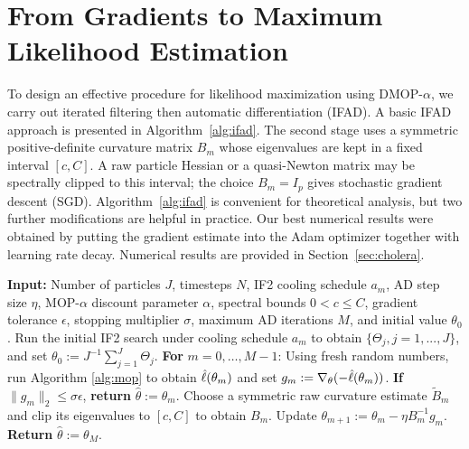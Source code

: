 \documentclass[numsec,webpdf,modern,medium,namedate]{oup-authoring-template}
\begin{document}
\section{From Gradients to Maximum Likelihood Estimation}

To design an effective procedure for likelihood maximization using DMOP-$\alpha$, we carry out iterated filtering then automatic differentiation (IFAD). 
A basic IFAD approach is presented in Algorithm~\ref{alg:ifad}.
The second stage uses a symmetric positive-definite curvature matrix $B_m$ whose
eigenvalues are kept in a fixed interval $[c,C]$.  A raw particle Hessian or a
quasi-Newton matrix may be spectrally clipped to this interval; the choice
$B_m=I_p$ gives stochastic gradient descent (SGD).
Algorithm~\ref{alg:ifad} is convenient for theoretical analysis, but two further modifications are helpful in practice.
Our best numerical results were obtained by putting the gradient estimate into the Adam optimizer \citep{kingma15} together with learning rate decay. 
Numerical results are provided in Section~\ref{sec:cholera}.

\begin{algorithm}[htbp!]
	\caption{IFAD}
    \label{alg:ifad}
	    \textbf{Input:} Number of particles $J$, timesteps $N$, IF2 cooling schedule $a_m$, AD step size $\eta$, MOP-$\alpha$ discount parameter $\alpha$, spectral bounds $0<c\leq C$, gradient tolerance $\epsilon$, stopping multiplier $\sigma$, maximum AD iterations $M$, and initial value $\theta_0$.\newline
        Run the initial IF2 search under cooling schedule $a_m$ to obtain $\{\Theta_j, j=1,...,J\}$, and set $\theta_0 := J^{-1}\sum_{j=1}^J \Theta_j.$\newline
		\textbf{For} $m=0,\ldots,M-1$: \newline
		\hspace*{4mm} Using fresh random numbers, run Algorithm \ref{alg:mop} to obtain $\hat{\ell}(\theta_m)$ and set $g_m := \nabla_{\theta}(-\hat{\ell}(\theta_m))$. \newline
		\hspace*{4mm} \textbf{If} $\|g_m\|_2\leq\sigma\epsilon$, \textbf{return} $\hat\theta:=\theta_m$. \newline
		\hspace*{4mm} Choose a symmetric raw curvature estimate $\widetilde B_m$ and clip its eigenvalues to $[c,C]$ to obtain $B_m$. \newline
		\hspace*{4mm} Update $\theta_{m+1} := \theta_m - \eta B_m^{-1} g_m$. \newline
		\textbf{Return} $\hat{\theta} := \theta_M.$
\end{algorithm}
\end{document}
